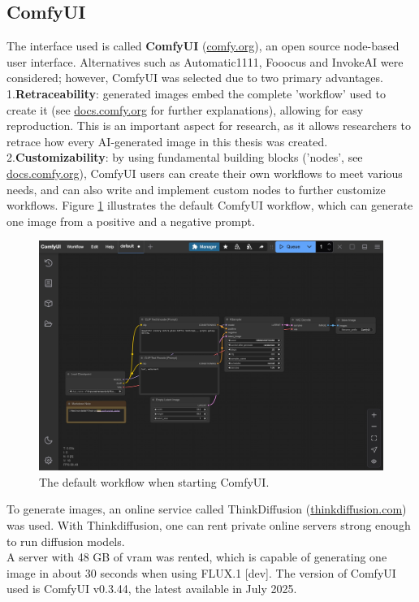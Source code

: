 \subsection{ComfyUI}
\sloppy
The interface used is called \textbf{ComfyUI} (\href{https://www.comfy.org/}{comfy.org}), an open source node-based user interface. Alternatives such as Automatic1111, Fooocus and InvokeAI were considered; however, ComfyUI was selected due to two primary advantages.\\ 
1.\textbf{Retraceability}: generated images embed the complete 'workflow' used to create it (see \href{https://docs.comfy.org/development/core-concepts/workflow}{docs.comfy.org} for further explanations), allowing for easy reproduction. This is an important aspect for research, as it allows researchers to retrace how every AI-generated image in this thesis was created.\\
2.\textbf{Customizability}: by using fundamental building blocks ('nodes', see \href{https://docs.comfy.org/development/core-concepts/nodes}{docs.comfy.org}), ComfyUI users can create their own workflows to meet various needs, and can also write and implement custom nodes to further customize workflows.
Figure \ref{fig:comfy interface} illustrates the default ComfyUI workflow, which can generate one image from a positive and a negative prompt.
\begin{figure}[H]
    \centering
    \includegraphics[width=0.8\linewidth]{Images//Methodology/comfyui_new_interface.jpg}
    \caption{The default workflow when starting ComfyUI.}
    \label{fig:comfy interface}
\end{figure}

To generate images, an online service called ThinkDiffusion (\href{https://www.thinkdiffusion.com/}{thinkdiffusion.com}) was used. With Thinkdiffusion, one can rent private online servers strong enough to run diffusion models.\\
A server with 48 GB of vram was rented, which is capable of generating one image in about 30 seconds when using FLUX.1 [dev]. The version of ComfyUI used is ComfyUI v0.3.44, the latest available in July 2025.
